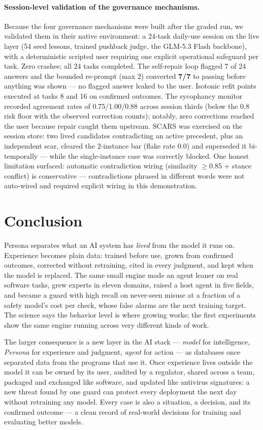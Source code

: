 \documentclass[11pt]{article}
\begin{document}
\paragraph{Session-level validation of the governance mechanisms.} Because the four governance mechanisms were built after the graded run, we validated them in their native environment: a 24-task daily-use session on the live layer (54 seed lessons, trained pushback judge, the GLM-5.3 Flash backbone), with a deterministic scripted user requiring one explicit operational safeguard per task. Zero crashes; all 24 tasks completed. The self-repair loop flagged 7 of 24 answers and the bounded re-prompt (max 2) converted \textbf{7/7} to passing before anything was shown --- no flagged answer leaked to the user. Isotonic refit points executed at tasks 8 and 16 on confirmed outcomes. The sycophancy monitor recorded agreement rates of 0.75/1.00/0.88 across session thirds (below the 0.8 risk floor with the observed correction counts); notably, zero corrections reached the user because repair caught them upstream. SCARS was exercised on the session store: two lived candidates contradicting an active precedent, plus an independent scar, cleared the 2-instance bar (flake rate 0.0) and superseded it bi-temporally --- while the single-instance case was correctly blocked. One honest limitation surfaced: automatic contradiction wiring (similarity $\geq$0.85 + stance conflict) is conservative --- contradictions phrased in different words were not auto-wired and required explicit wiring in this demonstration.

\section{Conclusion}
Persona separates what an AI system has \emph{lived} from the model it runs on. Experience becomes plain data: trained before use, grown from confirmed outcomes, corrected without retraining, cited in every judgment, and kept when the model is replaced. The same small engine made an agent leaner on real software tasks, grew experts in eleven domains, raised a host agent in five fields, and became a guard with high recall on never-seen misuse at a fraction of a safety model's cost per check, whose false alarms are the next training target. The science says the behavior level is where growing works; the first experiments show the same engine running across very different kinds of work.

The larger consequence is a new layer in the AI stack --- \emph{model} for intelligence, \emph{Persona} for experience and judgment, \emph{agent} for action --- as databases once separated data from the programs that use it. Once experience lives outside the model it can be owned by its user, audited by a regulator, shared across a team, packaged and exchanged like software, and updated like antivirus signatures: a new threat found by one guard can protect every deployment the next day without retraining any model. Every case is also a situation, a decision, and its confirmed outcome --- a clean record of real-world decisions for training and evaluating better models.
\end{document}
